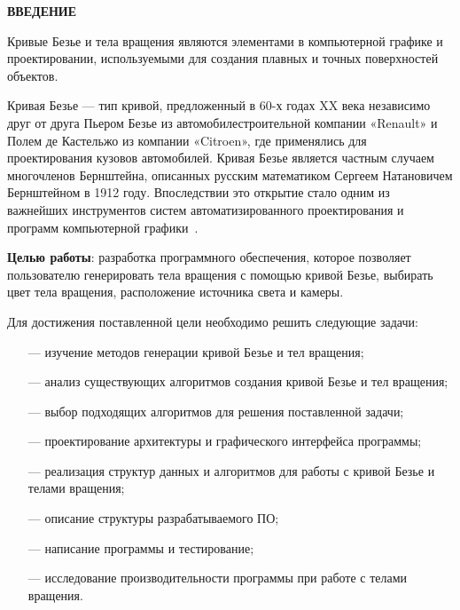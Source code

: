 \begin{center}
    \textbf{ВВЕДЕНИЕ}
\end{center}

Кривые Безье и тела вращения являются элементами в компьютерной графике и проектировании, используемыми для создания плавных и точных поверхностей объектов.

Кривая Безье — тип кривой, предложенный в 60-х годах XX века независимо друг от друга Пьером Безье из автомобилестроительной компании «Renault» и Полем де Кастельжо из компании «Citroen», где применялись для проектирования кузовов автомобилей. Кривая Безье является частным случаем многочленов Бернштейна, описанных русским математиком Сергеем Натановичем Бернштейном в 1912 году. Впоследствии это открытие стало одним из важнейших инструментов систем автоматизированного проектирования и программ компьютерной графики~\cite{bezier}.

\textbf{Целью работы}: разработка программного обеспечения, которое позволяет пользователю генерировать тела вращения с помощью кривой Безье, выбирать цвет тела вращения, расположение источника света и камеры.

Для достижения поставленной цели необходимо решить следующие
задачи:

\begin{itemize}
    \item[---] изучение методов генерации кривой Безье и тел вращения;
    \item[---] анализ существующих алгоритмов создания кривой Безье и тел вращения;
    \item[---] выбор подходящих алгоритмов для решения поставленной задачи;
    \item[---] проектирование архитектуры и графического интерфейса программы;
    \item[---] реализация структур данных и алгоритмов для работы с кривой Безье и телами вращения;
    \item[---] описание структуры разрабатываемого ПО;
    \item[---] написание программы и тестирование;
    \item[---] исследование производительности программы при работе с телами вращения.
\end{itemize}